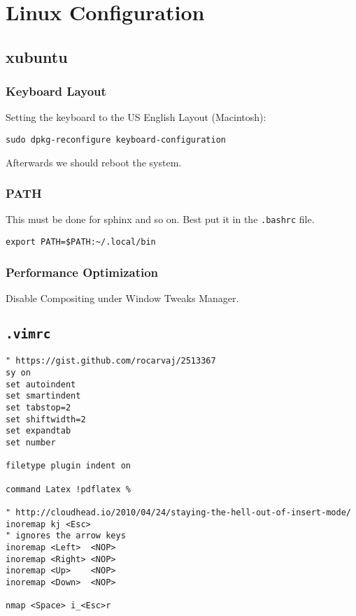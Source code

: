 \documentclass[../main/main.tex]{subfiles}
\begin{document}
\section{Linux Configuration}
\subsection{xubuntu}

\subsubsection{Keyboard Layout}

Setting the keyboard to the US English Layout (Macintosh):

\begin{lstlisting}
sudo dpkg-reconfigure keyboard-configuration
\end{lstlisting}

Afterwards we should reboot the system. 

\subsubsection{PATH}

This must be done for sphinx and so on. Best put it in the \lstinline|.bashrc|
file. 

\begin{lstlisting}
export PATH=$PATH:~/.local/bin
\end{lstlisting}

\subsubsection{Performance Optimization}

Disable Compositing under Window Tweaks Manager. 


\subsection{\lstinline|.vimrc|}
\begin{lstlisting}
" https://gist.github.com/rocarvaj/2513367
sy on
set autoindent
set smartindent
set tabstop=2
set shiftwidth=2
set expandtab
set number

filetype plugin indent on

command Latex !pdflatex %

" http://cloudhead.io/2010/04/24/staying-the-hell-out-of-insert-mode/
inoremap kj <Esc>
" ignores the arrow keys 
inoremap <Left>  <NOP>
inoremap <Right> <NOP>
inoremap <Up>    <NOP>
inoremap <Down>  <NOP>

nmap <Space> i_<Esc>r
\end{lstlisting}
\end{document}
